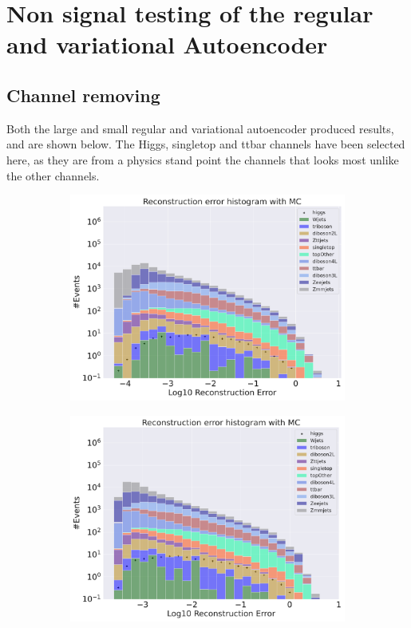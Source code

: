 \section{Non signal testing of the regular and variational Autoencoder}

\subsection*{Channel removing}

Both the large and small regular and variational autoencoder produced results, and are shown below. The Higgs, singletop and ttbar channels have been selected here, as they are 
from a physics stand point the channels that looks most unlike the other channels.  


\begin{figure}[h!]
    \centering
    \begin{subfigure}{.45\textwidth}
        \includegraphics[width=\textwidth]{Figures/AE_testing/small/b_data_recon_big_rm3_feats_sig_higgs.pdf}
        \caption{}
        \label{fig:ae_small_higgs}
    \end{subfigure}
    \hfill 
    \begin{subfigure}{.45\textwidth}
        \includegraphics[width=\textwidth]{Figures/AE_testing/big/b_data_recon_big_rm3_feats_sig_higgs.pdf}

\end{subfigure}
\end{figure}
